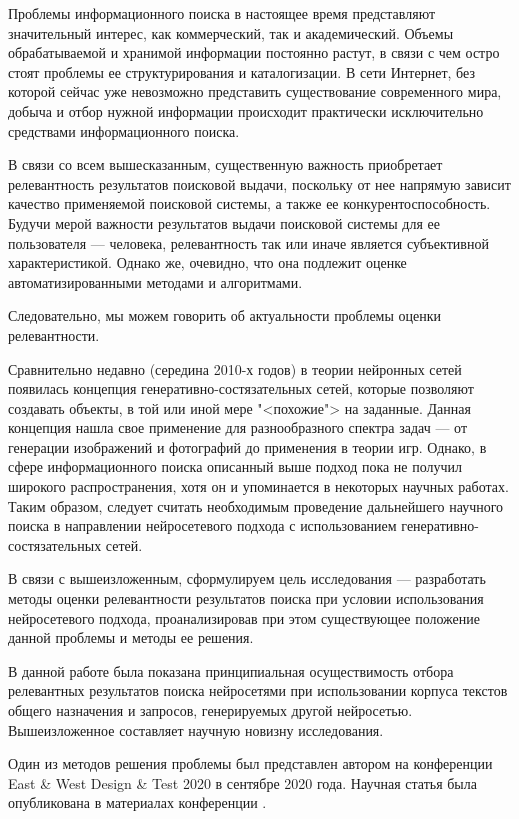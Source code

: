 Проблемы информационного поиска в настоящее время представляют значительный интерес, как коммерческий, так и академический. Объемы обрабатываемой
и хранимой информации постоянно растут, в связи с чем остро стоят проблемы ее структурирования и каталогизации. В сети Интернет, без которой сейчас
уже невозможно представить существование современного мира, добыча и отбор нужной информации происходит практически исключительно средствами 
информационного поиска. 

В связи со всем вышесказанным, существенную важность приобретает релевантность результатов поисковой выдачи, поскольку от нее напрямую зависит
качество применяемой поисковой системы, а также ее конкурентоспособность. Будучи мерой важности результатов выдачи поисковой системы для 
ее пользователя --- человека, релевантность так или иначе является субъективной характеристикой. Однако же, очевидно, что она подлежит оценке
автоматизированными методами и алгоритмами.

Следовательно, мы можем говорить об актуальности проблемы оценки релевантности.

Сравнительно недавно (середина 2010-х годов) в теории нейронных сетей появилась концепция генеративно-состязательных сетей, которые позволяют 
создавать объекты, в той или иной мере "<похожие"> на заданные. Данная концепция нашла свое применение для разнообразного спектра задач --- от 
генерации изображений и фотографий до применения в теории игр. Однако, в сфере информационного поиска описанный выше подход пока не получил
широкого распространения, хотя он и упоминается в некоторых научных работах. Таким образом, следует считать необходимым проведение
дальнейшего научного поиска в направлении нейросетевого подхода с использованием генеративно-состязательных сетей.


В связи с вышеизложенным, сформулируем цель исследования --- разработать методы оценки релевантности результатов поиска при 
условии использования нейросетевого подхода, проанализировав при этом существующее положение данной проблемы и методы ее решения.

В данной работе была показана принципиальная осуществимость отбора релевантных результатов поиска нейросетями при использовании
корпуса текстов общего назначения и запросов, генерируемых другой нейросетью. Вышеизложенное составляет научную новизну исследования.

Один из методов решения проблемы был представлен автором на конференции East \& West Design \& Test 2020 в сентябре 2020 года. 
Научная статья была опубликована в материалах конференции \cite{9224840}. %

